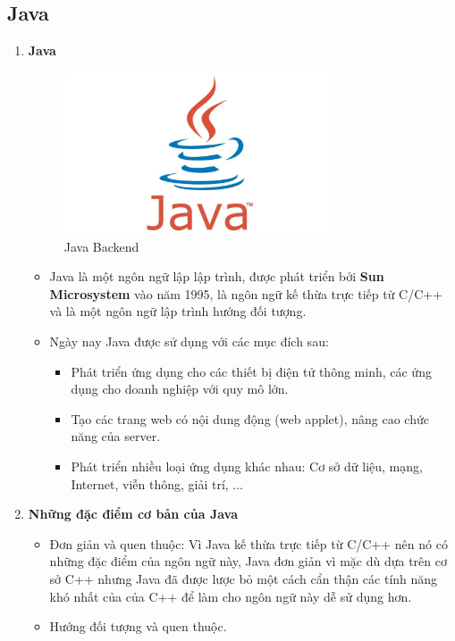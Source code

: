 \subsection{Java}
\begin{enumerate}
    \item \textbf{Java}
    \begin{figure}[H]
        \centering
        \includegraphics[width = 8cm]{image/java-logo.jpeg}
        \caption{Java Backend}
        \label{fig:java_logo}
    \end{figure}
    \begin{itemize}
        \item Java là một ngôn ngữ lập lập trình, được phát triển bởi \textbf{Sun Microsystem} vào năm 1995, là ngôn ngữ kế thừa trực tiếp từ C/C++ và là một ngôn ngữ lập trình hướng đối tượng.
        \item Ngày nay Java được sử dụng với các mục đích sau:
        \begin{itemize}
            \item Phát triển ứng dụng cho các thiết bị điện tử thông minh, các ứng dụng cho doanh nghiệp với quy mô lớn.
            \item Tạo các trang web có nội dung động (web applet), nâng cao chức năng của server.
            \item Phát triển nhiều loại ứng dụng khác nhau: Cơ sở dữ liệu, mạng, Internet, viễn thông, giải trí, ...
        \end{itemize}
    \end{itemize}
    \item \textbf{Những đặc điểm cơ bản của Java}
    \begin{itemize}
        \item Đơn giản và quen thuộc: Vì Java kế thừa trực tiếp từ C/C++ nên nó có những đặc điểm của ngôn ngữ này, Java đơn giản vì mặc dù dựa trên cơ sở C++ nhưng Java đã được lược bỏ một cách cẩn thận các tính năng khó nhất của của C++ để làm cho ngôn ngữ này dễ sử dụng hơn.
        \item Hướng đối tượng và quen thuộc.

\end{itemize}
\end{enumerate}

